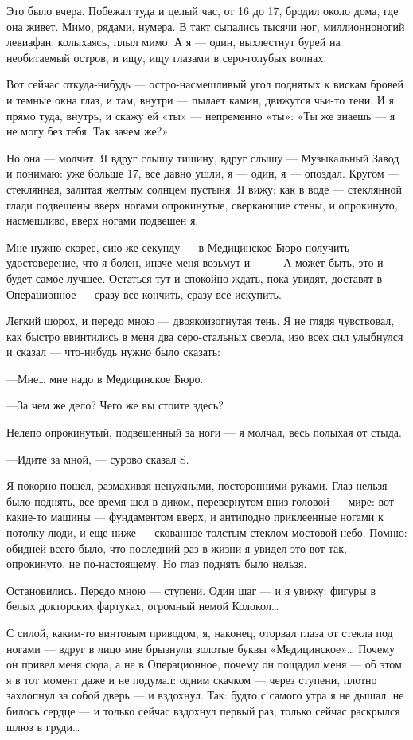 \documentclass[11pt,openany]{book}
\begin{document}
Это было вчера. Побежал туда и целый час, от 16 до 17, бродил около дома, где она живет. Мимо, рядами, нумера. В такт сыпались тысячи ног, миллионноногий левиафан, колыхаясь, плыл мимо. А я --- один, выхлестнут бурей на необитаемый остров, и ищу, ищу глазами в серо-голубых волнах.

Вот сейчас откуда-нибудь --- остро-насмешливый угол поднятых к вискам бровей и темные окна глаз, и там, внутри --- пылает камин, движутся чьи-то тени. И я прямо туда, внутрь, и скажу ей «ты» --- непременно «ты»: «Ты же знаешь --- я не могу без тебя. Так зачем же?»

Но она --- молчит. Я вдруг слышу тишину, вдруг слышу --- Музыкальный Завод и понимаю: уже больше 17, все давно ушли, я --- один, я --- опоздал. Кругом --- стеклянная, залитая желтым солнцем пустыня. Я вижу: как в воде --- стеклянной глади подвешены вверх ногами опрокинутые, сверкающие стены, и опрокинуто, насмешливо, вверх ногами подвешен я.

Мне нужно скорее, сию же секунду --- в Медицинское Бюро получить удостоверение, что я болен, иначе меня возьмут и --- --- А может быть, это и будет самое лучшее. Остаться тут и спокойно ждать, пока увидят, доставят в Операционное --- сразу все кончить, сразу все искупить.

Легкий шорох, и передо мною --- двоякоизогнутая тень. Я не глядя чувствовал, как быстро ввинтились в меня два серо-стальных сверла, изо всех сил улыбнулся и сказал --- что-нибудь нужно было сказать:

---Мне\ldots{} мне надо в Медицинское Бюро.

---За чем же дело? Чего же вы стоите здесь?

Нелепо опрокинутый, подвешенный за ноги --- я молчал, весь полыхая от стыда.

---Идите за мной, --- сурово сказал S.

Я покорно пошел, размахивая ненужными, посторонними руками. Глаз нельзя было поднять, все время шел в диком, перевернутом вниз головой --- мире: вот какие-то машины --- фундаментом вверх, и антиподно приклеенные ногами к потолку люди, и еще ниже --- скованное толстым стеклом мостовой небо. Помню: обидней всего было, что последний раз в жизни я увидел это вот так, опрокинуто, не по-настоящему. Но глаз поднять было нельзя.

Остановились. Передо мною --- ступени. Один шаг --- и я увижу: фигуры в белых докторских фартуках, огромный немой Колокол\ldots{}

С силой, каким-то винтовым приводом, я, наконец, оторвал глаза от стекла под ногами --- вдруг в лицо мне брызнули золотые буквы «Медицинское»\ldots{} Почему он привел меня сюда, а не в Операционное, почему он пощадил меня --- об этом я в тот момент даже и не подумал: одним скачком --- через ступени, плотно захлопнул за собой дверь --- и вздохнул. Так: будто с самого утра я не дышал, не билось сердце --- и только сейчас вздохнул первый раз, только сейчас раскрылся шлюз в груди\ldots{}
\end{document}
